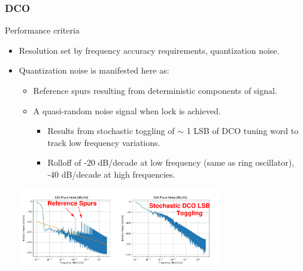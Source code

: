\documentclass[t, screen, aspectratio=43]{beamer}
\begin{document}

\begin{frame}
	\frametitle{DCO}
	\begin{block}{Performance criteria}
		\vspace{-.2em}
		\begin{itemize}
			\scriptsize
			\item Resolution set by frequency accuracy requirements, quantization noise.
			\item Quantization noise is manifested here as:
			\begin{itemize}
				\scriptsize			
				\item Reference spurs resulting from deterministic components of signal.
				\item A quasi-random noise signal when lock is achieved.
				\begin{itemize}
					\scriptsize			
					\item Results from stochastic toggling of $\sim$ 1 LSB of DCO tuning word to track low frequency variations.
					\item Rolloff of -20 dB/decade at low frequency (same as ring oscillator), -40 dB/decade at high frequencies.
				\end{itemize} 				
			\end{itemize} 
		\vspace{-1em}
		\center\includegraphics[width=0.7\textwidth, angle=0]{quant_noise.pdf}
		\vspace{-0.5em}  
		\end{itemize}    
	\end{block}
\end{frame}
\end{document}
